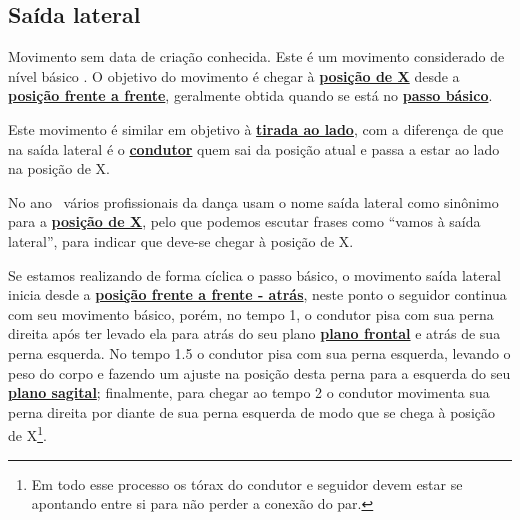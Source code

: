 \subsection{Saída lateral}
\label{subsec:saidalateral}

Movimento sem data de criação conhecida.
Este é um movimento considerado de nível básico \cite[pp. 144]{perna2002samba}.
O objetivo do movimento é chegar à \hyperref[def:X-position]{\textbf{posição de X}} 
desde a \hyperref[def:frente-frente-position]{\textbf{posição frente a frente}}, 
geralmente obtida quando se está no \hyperref[subsec:passobasico]{\textbf{passo básico}}.

Este movimento é similar em objetivo à \hyperref[subsec:tiradaaolado]{\textbf{tirada ao lado}},
com a diferença de que na saída lateral é o \hyperref[def:Condutor]{\textbf{condutor}} 
quem sai da posição atual e passa a estar ao lado na posição de X. 

No ano \AnoLivro~vários profissionais da dança usam o nome saída lateral como sinônimo para a  
\hyperref[def:X-position]{\textbf{posição de X}}, pelo que podemos escutar frases como
``vamos à saída lateral'', para indicar que deve-se chegar à posição de X.

\caracterpostura{\NoCheckedItem}{\CheckedItem}
Se estamos realizando de forma cíclica o passo básico, o movimento saída lateral 
inicia desde a \hyperref[def:ffa-position]{\textbf{posição frente a frente - atrás}},
neste ponto o seguidor continua com seu movimento básico, porém, no tempo 1, 
o condutor pisa com sua perna direita após ter levado ela para atrás do seu plano 
\hyperref[def:PlanoFrontal]{\textbf{plano frontal}} e atrás de sua perna esquerda.
No tempo 1.5 o condutor pisa com sua perna esquerda, levando o peso do corpo e fazendo um ajuste na posição 
desta perna para a esquerda do seu \hyperref[def:PlanoSagital]{\textbf{plano sagital}};
finalmente, para chegar ao tempo 2 o condutor movimenta sua perna direita 
por diante de sua perna esquerda de modo que se chega à 
posição de X\footnote{\label{ref:saidalateral}Em todo esse processo os tórax do condutor 
e seguidor devem estar se apontando entre si para não perder a conexão do par.}.
 
 

